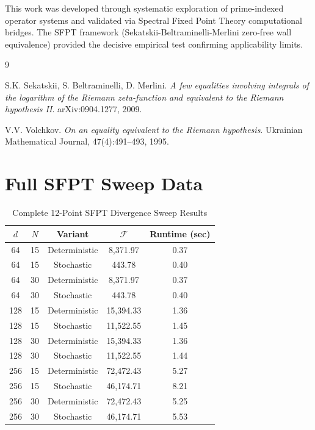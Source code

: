 \documentclass[11pt]{article}
\begin{document}
This work was developed through systematic exploration of prime-indexed operator systems and validated via Spectral Fixed Point Theory computational bridges. The SFPT framework (Sekatskii-Beltraminelli-Merlini zero-free wall equivalence) provided the decisive empirical test confirming applicability limits.


\begin{thebibliography}{9}

S.K. Sekatskii, S. Beltraminelli, D. Merlini.
\textit{A few equalities involving integrals of the logarithm of the Riemann zeta-function and equivalent to the Riemann hypothesis II}.
arXiv:0904.1277, 2009.

V.V. Volchkov.
\textit{On an equality equivalent to the Riemann hypothesis}.
Ukrainian Mathematical Journal, 47(4):491--493, 1995.

\end{thebibliography}

\appendix

\section{Full SFPT Sweep Data}

\begin{table}[h]
\centering
\caption{Complete 12-Point SFPT Divergence Sweep Results}
\begin{tabular}{ccccc}
\toprule
$d$ & $N$ & Variant & $\mathcal{F}$ & Runtime (sec) \\
\midrule
64  & 15 & Deterministic & 8,371.97  & 0.37 \\
64  & 15 & Stochastic    & 443.78    & 0.40 \\
64  & 30 & Deterministic & 8,371.97  & 0.37 \\
64  & 30 & Stochastic    & 443.78    & 0.40 \\
128 & 15 & Deterministic & 15,394.33 & 1.36 \\
128 & 15 & Stochastic    & 11,522.55 & 1.45 \\
128 & 30 & Deterministic & 15,394.33 & 1.36 \\
128 & 30 & Stochastic    & 11,522.55 & 1.44 \\
256 & 15 & Deterministic & 72,472.43 & 5.27 \\
256 & 15 & Stochastic    & 46,174.71 & 8.21 \\
256 & 30 & Deterministic & 72,472.43 & 5.25 \\
256 & 30 & Stochastic    & 46,174.71 & 5.53 \\
\bottomrule
\end{tabular}
\end{table}
\end{document}
